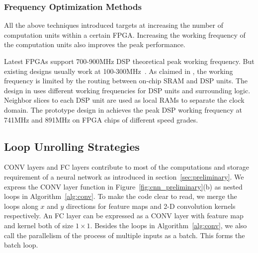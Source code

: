 \subsubsection{Frequency Optimization Methods}
All the above techniques introduced targets at increasing the number of computation units within a certain FPGA. Increasing the working frequency of the computation units also improves the peak performance.

Latest FPGAs support 700-900MHz DSP theoretical peak working frequency. But existing designs usually work at 100-300MHz~\cite{qiu2016going, guo2017angel, zhang2016caffeine, ma2017optimizing}. As claimed in \cite{wu2017high}, the working frequency is limited by the routing between on-chip SRAM and DSP units. The design in \cite{wu2017high} uses different working frequencies for DSP units and surrounding logic. Neighbor slices to each DSP unit are used as local RAMs to separate the clock domain. The prototype design in \cite{wu2017high} achieves the peak DSP working frequency at 741MHz and 891MHz on FPGA chips of different speed grades. 

\subsection{Loop Unrolling Strategies}\label{sec:hardware:lu}
CONV layers and FC layers contribute to most of the computations and storage requirement of a neural network as introduced in section~\ref{sec:preliminary}. We express the CONV layer function in Figure~\ref{fig:cnn_preliminary}(b) as nested loops in Algorithm~\ref{alg:conv}. To make the code clear to read, we merge the loops along $x$ and $y$ directions for feature maps and 2-D convolution kernels respectively. An FC layer can be expressed as a CONV layer with feature map and kernel both of size $1\times 1$. Besides the loops in Algorithm~\ref{alg:conv}, we also call the parallelism of the process of multiple inputs as a batch. This forms the batch loop.

